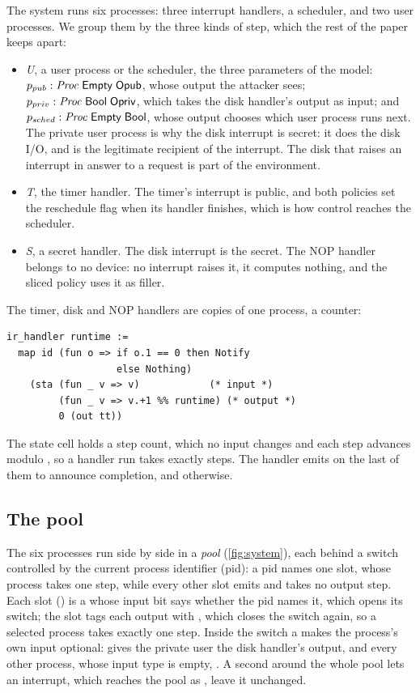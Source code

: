 The system runs six processes: three interrupt handlers, a scheduler, and two user
processes. We group them by the three kinds of step, which the rest of the
paper keeps apart:
\begin{itemize}
\item \emph{U}, a user process or the scheduler, the three parameters of the model:
  $p_{pub} : \mathit{Proc}\;\mathsf{Empty}\;\mathsf{Opub}$, whose output the attacker sees;
  $p_{priv} : \mathit{Proc}\;\mathsf{Bool}\;\mathsf{Opriv}$, which takes the disk handler's
  output as input; and $p_{sched} : \mathit{Proc}\;\mathsf{Empty}\;\mathsf{Bool}$, whose
  output chooses which user process runs next. The private user process is why the
  disk interrupt is secret: it does the disk I/O, and is the legitimate recipient of
  the interrupt. The disk that raises an interrupt in answer to a request is part of
  the environment.
\item \emph{T}, the timer handler. The timer's interrupt is public, and both policies
  set the reschedule flag when its handler finishes, which is how control reaches
  the scheduler.
\item \emph{S}, a secret handler. The disk interrupt is the secret. The NOP handler
  belongs to no device: no interrupt raises it, it computes nothing, and the sliced
  policy uses it as filler.
\end{itemize}
The timer, disk and NOP handlers are copies of one process, a counter:
\begin{lstlisting}
ir_handler runtime :=
  map id (fun o => if o.1 == 0 then Notify
                   else Nothing)
    (sta (fun _ v => v)            (* input *)
         (fun _ v => v.+1 %% runtime) (* output *)
         0 (out tt))
\end{lstlisting}
The state cell holds a step count, which no input changes and each step advances
modulo , so a handler run takes exactly  steps. The
handler emits  on the last of them to announce completion, and
 otherwise.

\subsection{The pool}\label{sec:pool}

The six processes run side by side in a \emph{pool} (\cref{fig:system}), each behind
a switch controlled by the current process identifier (pid): a pid names one slot,
whose process takes one step, while every other slot emits  and takes no
output step. Each slot
() is a
 whose input bit says whether the pid names it, which opens its switch;
the slot tags each output with , which closes the switch again, so a
selected process takes exactly one step.
Inside the switch a  makes the process's own input optional:
 gives the private user the disk handler's output, and every other process,
whose input type is empty, . A second  around the whole pool
lets an interrupt, which reaches the pool as , leave it unchanged.

